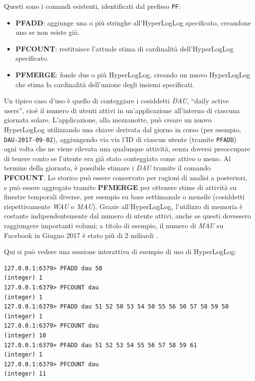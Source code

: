 Questi sono i comandi esistenti, identificati dal prefisso \verb|PF|:

\begin{itemize}
	\medskip
	\item \textbf{PFADD}: aggiunge una o più stringhe all'HyperLogLog specificato, creandone uno
	se non esiste già.
	\item \textbf{PFCOUNT}: restituisce l'attuale stima di cardinalità dell'HyperLogLog
	specificato.
	\item \textbf{PFMERGE}: fonde due o più HyperLogLog, creando un nuovo HyperLogLog che stima la
	cardinalità dell'unione degli insiemi specificati.
\end{itemize}

Un tipico caso d'uso è quello di conteggiare i cosiddetti \emph{DAU}, ``daily active users'', cioè
il numero di utenti attivi in un'applicazione all'interno di ciascuna giornata solare.
L'applicazione, alla mezzanotte, può creare un nuovo HyperLogLog utilizzando una chiave derivata dal
giorno in corso (per esempio, \verb|DAU-2017-09-02|), aggiungendo via via l'ID di ciascun utente
(tramite \verb|PFADD|) ogni volta che ne viene rilevata una qualunque attività, senza doversi
preoccupare di tenere conto se l'utente era già stato conteggiato come attivo o meno. Al termine
della giornata, è possibile stimare i \emph{DAU} tramite il comando \textbf{PFCOUNT}. Lo storico può
essere conservato per ragioni di analisi a posteriori, e può essere aggregato tramite
\textbf{PFMERGE} per ottenere stime di attività su finestre temporali diverse, per esempio su base
settimanale o mensile (cosiddetti rispettivamente \emph{WAU} o \emph{MAU}). Grazie all'HyperLogLog,
l'utilizzo di memoria è costante indipendentemente dal numero di utente attivi, anche se questi
dovessero raggiungere importanti volumi; a titolo di esempio, il numero di \emph{MAU} su Facebook in
Giugno 2017 è stato più di 2 miliardi \cite{fb-mau}.

Qui si può vedere una sessione interattiva di esempio di uso di HyperLogLog:

\medskip
\begin{lstlisting}
127.0.0.1:6379> PFADD dau 50
(integer) 1
127.0.0.1:6379> PFCOUNT dau
(integer) 1
127.0.0.1:6379> PFADD dau 51 52 50 53 54 50 55 56 50 57 58 59 50
(integer) 1
127.0.0.1:6379> PFCOUNT dau
(integer) 10
127.0.0.1:6379> PFADD dau 51 52 53 54 55 56 57 58 59 61
(integer) 1
127.0.0.1:6379> PFCOUNT dau
(integer) 11
\end{lstlisting}


